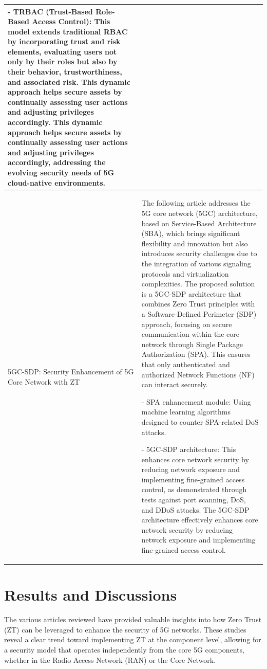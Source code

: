 \documentclass{report}
\begin{document}
\begin{longtable}{|p{4cm}|p{12cm}|}
    - \textbf{TRBAC (Trust-Based Role-Based Access Control):} This model extends traditional RBAC by incorporating trust and risk elements, evaluating users not only by their roles but also by their behavior, trustworthiness, and associated risk. This dynamic approach helps secure assets by continually assessing user actions and adjusting privileges accordingly.  
    This dynamic approach helps secure assets by continually assessing user actions and adjusting privileges accordingly, addressing the evolving security needs of 5G cloud-native environments. \\ 
    \hline

    5GC-SDP: Security Enhancement of 5G Core Network with ZT & The following article addresses the 5G core network (5GC) architecture, based on Service-Based Architecture (SBA), which brings significant flexibility and innovation but also introduces security challenges due to the integration of various signaling protocols and virtualization complexities. The proposed solution is a 5GC-SDP architecture that combines Zero Trust principles with a Software-Defined Perimeter (SDP) approach, focusing on secure communication within the core network through Single Package Authorization (SPA). This ensures that only authenticated and authorized Network Functions (NF) can interact securely.  

    - SPA enhancement module: Using machine learning algorithms designed to counter SPA-related DoS attacks. 

    - 5GC-SDP architecture: This enhances core network security by reducing network exposure and implementing fine-grained access control, as demonstrated through tests against port scanning, DoS, and DDoS attacks.  
    The 5GC-SDP architecture effectively enhances core network security by reducing network exposure and implementing fine-grained access control. \\ 
    \hline
    
\end{longtable}

\section{Results and Discussions}
    The various articles reviewed have provided valuable insights into how Zero Trust (ZT) can be leveraged to enhance the security of 5G networks. These studies reveal a clear trend toward implementing ZT at the component level, allowing for a security model that operates independently from the core 5G components, whether in the Radio Access Network (RAN) or the Core Network.
\end{document}
